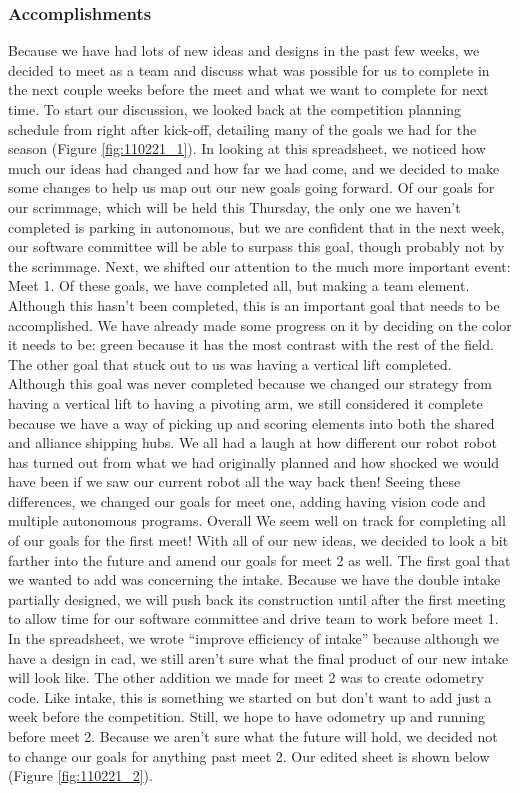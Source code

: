 \subsubsection*{Accomplishments}
Because we have had lots of new ideas and designs in the past few weeks, we decided to meet as a team and discuss what was possible for us to complete in the next couple weeks before the meet and what we want to complete for next time. To start our discussion, we looked back at the competition planning schedule from right after kick-off, detailing many of the goals we had for the season (Figure \ref{fig:110221_1}). In looking at this spreadsheet, we noticed how much our ideas had changed and how far we had come, and we decided to make some changes to help us map out our new goals going forward. 
Of our goals for our scrimmage, which will be held this Thursday, the only one we haven't completed is parking in autonomous, but we are confident that in the next week, our software committee will be able to surpass this goal, though probably not by the scrimmage. 
Next, we shifted our attention to the much more important event: Meet 1. Of these goals, we have completed all, but making a team element. Although this hasn’t been completed, this is an important goal that needs to be accomplished. We have already made some progress on it by deciding on the color it needs to be: green because it has the most contrast with the rest of the field. The other goal that stuck out to us was having a vertical lift completed. Although this goal was never completed because we changed our strategy from having a vertical lift to having a pivoting arm, we still considered it complete because we have a way of picking up and scoring elements into both the shared and alliance shipping hubs. We all had a laugh at how different our robot robot has turned out from what we had originally planned and how shocked we would have been if we saw our current robot all the way back then! Seeing these differences, we changed our goals for meet one, adding having vision code and multiple autonomous programs. Overall We seem well on track for completing all of our goals for the first meet!
With all of our new ideas, we decided to look a bit farther into the future and amend our goals for meet 2 as well. The first goal that we wanted to add was concerning the intake. Because we have the double intake partially designed, we will push back its construction until after the first meeting to allow time for our software committee and drive team to work before meet 1. In the spreadsheet, we wrote “improve efficiency of intake” because although we have a design in cad, we still aren't sure what the final product of our new intake will look like. The other addition we made for meet 2 was to create odometry code. Like intake, this is something we started on but don’t want to add just a week before the competition. Still, we hope to have odometry up and running before meet 2. Because we aren't sure what the future will hold, we decided not to change our goals for anything past meet 2. Our edited sheet is shown below (Figure \ref{fig:110221_2}).

